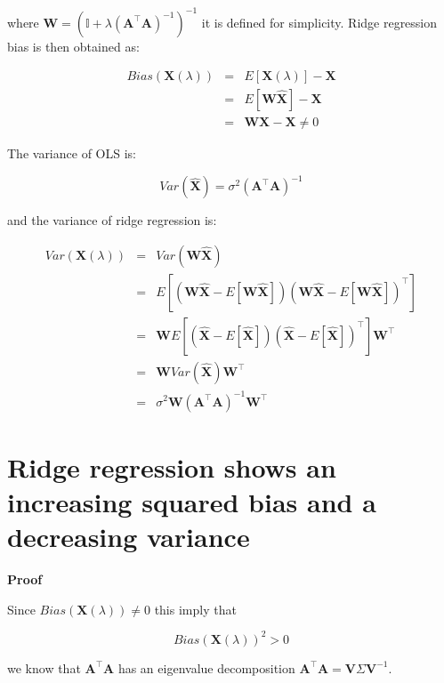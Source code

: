 \noindent where $\mathbf{W}  = (\mathbb{I} + \lambda (\mathbf{A}^\top
\mathbf{A})^{-1})^{-1}  $ it is defined for simplicity. Ridge
regression bias is then obtained as:

\begin{eqnarray*}
Bias(\mathbf{X}(\lambda)) &=& E[\mathbf{X}(\lambda)] - \mathbf{X} \\
&=& E[\mathbf{W}\hat{\mathbf{X}}] - \mathbf{X} \\
&=&  \mathbf{W} \mathbf{X} - \mathbf{X} \neq 0 
\end{eqnarray*}


The variance of OLS is:

\begin{equation*}
Var(\hat{\mathbf{X}}) = \sigma^2 (\mathbf{A}^\top \mathbf{A} )^{-1}
\end{equation*}

\noindent and the variance of ridge regression is:

\begin{eqnarray*}
Var(\mathbf{X}(\lambda)) &=& Var(\mathbf{W}\hat{\mathbf{X}}) \\
&=& E[(\mathbf{W}\hat{\mathbf{X}}-E[\mathbf{W}\hat{\mathbf{X}}])(\mathbf{W}\hat{\mathbf{X}}-E[\mathbf{W}\hat{\mathbf{X}}])^\top] \\
&=& \mathbf{W}E[(\hat{\mathbf{X}}-E[\hat{\mathbf{X}}])(\hat{\mathbf{X}}-E[\hat{\mathbf{X}}])^\top] \mathbf{W}^\top \\
&=& \mathbf{W}Var(\hat{\mathbf{X}})\mathbf{W}^\top \\
&=& \sigma^2 \mathbf{W}(\mathbf{A}^\top \mathbf{A} )^{-1}\mathbf{W}^\top
\end{eqnarray*}

\section{Ridge regression shows an
increasing squared bias and a decreasing variance} \label{app:rrbiasvar}

\textbf{Proof}\quad

Since $Bias(\mathbf{X}(\lambda)) \neq 0$ this imply that

\begin{equation*}
Bias(\mathbf{X}(\lambda)) ^2 > 0 
\end{equation*}

\noindent we know that $\mathbf{A}^\top
\mathbf{A}$ has an eigenvalue decomposition $\mathbf{A}^\top
\mathbf{A} = \mathbf{V} \Sigma \mathbf{V}^{-1}$.


